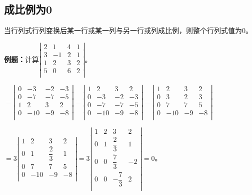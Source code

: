 \documentclass[UTF8, 12pt]{ctexart}
\begin{document}
\subsection{成比例为0}

当行列式行列变换后某一行或某一列与另一行或列成比例，则整个行列式值为0。

\textbf{例题：}计算$\left|\begin{array}{cccc} 
    2 & 1 & 4 & 1 \\
    3 & -1  & 2 & 1 \\
    1 & 2 & 3 & 2 \\
    5 & 0 & 6 & 2 \\
\end{array}\right|$。

$=\left|\begin{array}{cccc} 
    0 & -3 & -2 & -3 \\
    0 & -7  & -7 & -5 \\
    1 & 2 & 3 & 2 \\
    0 & -10 & -9 & -8 \\
\end{array}\right|=\left|\begin{array}{cccc} 
    1 & 2 & 3 & 2 \\
    0 & -3 & -2 & -3 \\
    0 & -7  & -7 & -5 \\
    0 & -10 & -9 & -8 \\
\end{array}\right|=\left|\begin{array}{cccc} 
    1 & 2 & 3 & 2 \\
    0 & 3 & 2 & 3 \\
    0 & 7  & 7 & 5 \\
    0 & -10 & -9 & -8 \\
\end{array}\right|$

$=3\left|\begin{array}{cccc} 
    1 & 2 & 3 & 2 \\
    0 & 1 & \dfrac{2}{3} & 1 \\
    0 & 7  & 7 & 5 \\
    0 & -10 & -9 & -8 \\
\end{array}\right|
=3\left|\begin{array}{cccc} 
    1 & 2 & 3 & 2 \\
    0 & 1 & \dfrac{2}{3} & 1 \\
    0 & 0  & \dfrac{7}{3} & -2 \\
    0 & 0  & -\dfrac{7}{3} & 2 \\
\end{array}\right|=0$。
\end{document}
